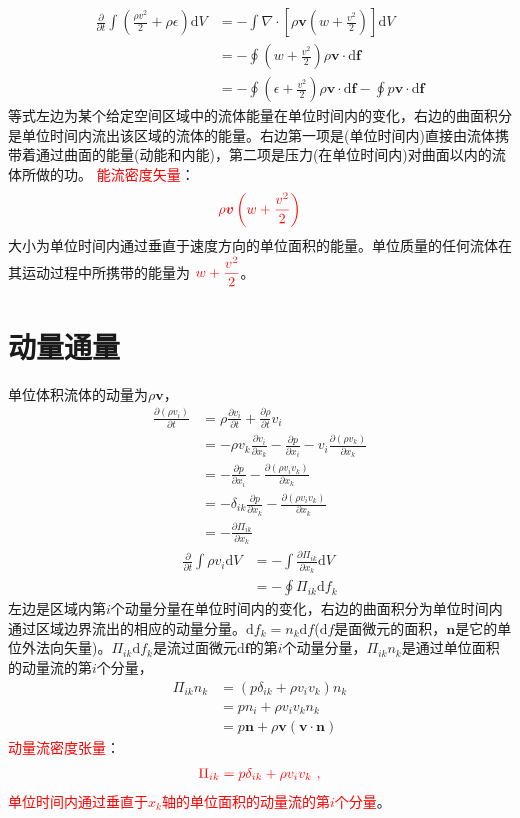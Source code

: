 \documentclass[12pt,a4paper]{article}
\renewcommand{\vec}[1]{\boldsymbol{#1}}
\newcommand{\dif}{\mathrm{d}}
\begin{document}
\begin{align*}
\frac{\partial }{\partial t} \int \left(\frac{\rho v^2}{2} + \rho \epsilon \right) \dif V &= -\int \nabla \cdot \left[\rho \vec{v} \left(w + \frac{v^2}{2} \right) \right] \dif V \\
&= -\oint \left(w + \frac{v^2}{2} \right) \rho \vec{v} \cdot \dif \vec{f} \\
&= -\oint \left(\epsilon + \frac{v^2}{2} \right) \rho \vec{v} \cdot \dif \vec{f} -\oint p\vec{v} \cdot \dif \vec{f} 
\end{align*}
等式左边为某个给定空间区域中的流体能量在单位时间内的变化，右边的曲面积分是单位时间内流出该区域的流体的能量。右边第一项是(单位时间内)直接由流体携带着通过曲面的能量(动能和内能)，第二项是压力(在单位时间内)对曲面以内的流体所做的功。
\textcolor{red}{能流密度矢量}：
\begin{equation}
\color{red} \rho \vec{v} \left(w + \frac{v^2}{2} \right)
\end{equation}
大小为单位时间内通过垂直于速度方向的单位面积的能量。单位质量的任何流体在其运动过程中所携带的能量为
$\color{red} w + \dfrac{v^2}{2}$。


\section{动量通量}
单位体积流体的动量为$\rho \vec{v}$，
\begin{align*}
\frac{\partial (\rho v_i)}{\partial t} &= \rho \frac{\partial v_i}{\partial t} +\frac{\partial \rho}{\partial t} v_i \\
&= -\rho v_k \frac{\partial v_i}{\partial x_k} -\frac{\partial p}{\partial x_i} -v_i \frac{\partial (\rho v_k)}{\partial x_k} \\
&= -\frac{\partial p}{\partial x_i} -\frac{\partial (\rho v_iv_k)}{\partial x_k} \\
&= -\delta_{ik}\frac{\partial p}{\partial x_k} -\frac{\partial (\rho v_iv_k)}{\partial x_k} \\
&= -\frac{\partial \Pi_{ik}}{\partial x_k}
\end{align*}
\begin{align*}
\frac{\partial }{\partial t} \int \rho v_i \dif V &= -\int \frac{\partial \Pi_{ik}}{\partial x_k} \dif V \\
&= -\oint \Pi_{ik} \dif f_k
\end{align*}
左边是区域内第$i$个动量分量在单位时间内的变化，右边的曲面积分为单位时间内通过区域边界流出的相应的动量分量。$\dif f_k = n_k \dif f$($\dif f$是面微元的面积，$\vec{n}$是它的单位外法向矢量)。$\Pi_{ik} \dif f_k$是流过面微元$\dif \vec{f}$的第$i$个动量分量，$\Pi_{ik} n_k$是通过单位面积的动量流的第$i$个分量，
\begin{align*}
\Pi_{ik} n_k &= (p\delta_{ik} +\rho v_iv_k) n_k \\
&= pn_i +\rho v_i v_k n_k \\
&= p\vec{n} +\rho \vec{v} (\vec{v} \cdot \vec{n})
\end{align*}
\textcolor{red}{动量流密度张量}：
\begin{align}
\color{red} \Pi_{ik} = p\delta_{ik} +\rho v_iv_k ~,
\end{align}
\textcolor{red}{单位时间内通过垂直于$x_k$轴的单位面积的动量流的第$i$个分量}。
\end{document}
